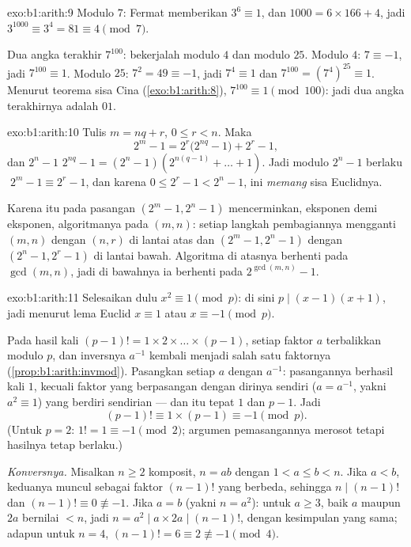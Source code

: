 \begin{solution}{exo:b1:arith:9}
Modulo $7$: Fermat memberikan $3^6 \equiv 1$, dan $1000 = 6 \times 166 + 4$,
jadi $3^{1000} \equiv 3^4 = 81 \equiv 4 \pmod 7$.

Dua angka terakhir $7^{100}$: bekerjalah modulo $4$ dan modulo $25$. Modulo $4$: $7
\equiv -1$, jadi $7^{100} \equiv 1$. Modulo $25$: $7^2 = 49 \equiv -1$, jadi
$7^4 \equiv 1$ dan $7^{100} = (7^4)^{25} \equiv 1$. Menurut teorema sisa
Cina (\cref{exo:b1:arith:8}), $7^{100} \equiv 1
\pmod{100}$: jadi dua angka terakhirnya adalah $01$.
\end{solution}

\begin{solution}{exo:b1:arith:10}
Tulis $m = nq + r$, $0 \leq r < n$. Maka
\[
2^m - 1 = 2^r\bigl(2^{nq} - 1\bigr) + 2^r - 1,
\]
dan $2^n - 1$  $2^{nq} - 1 = (2^n - 1)(2^{n(q-1)} + \dots +
1)$. Jadi modulo $2^n - 1$ berlaku $\;2^m - 1 \equiv 2^r - 1$, dan karena $0 \leq
2^r - 1 < 2^n - 1$, ini \emph{memang} sisa Euclidnya.

Karena itu  pada pasangan $(2^m - 1, 2^n - 1)$
mencerminkan, eksponen demi eksponen, algoritmanya pada $(m, n)$: setiap
langkah pembagiannya mengganti $(m, n)$ dengan $(n, r)$ di lantai atas dan $(2^m - 1,
2^n - 1)$ dengan $(2^n - 1, 2^r - 1)$ di lantai bawah. Algoritma di atasnya
berhenti pada $\gcd(m,n)$, jadi di bawahnya ia berhenti pada
$2^{\gcd(m,n)} - 1$.
\end{solution}

\begin{solution}{exo:b1:arith:11}
Selesaikan dulu $x^2 \equiv 1 \pmod p$: di sini $p \mid (x-1)(x+1)$, jadi menurut
lema Euclid $x \equiv 1$ atau $x \equiv -1 \pmod p$.

Pada hasil kali $(p-1)! = 1 \times 2 \times \dots \times (p-1)$, setiap
faktor $a$ terbalikkan modulo $p$, dan inversnya $a^{-1}$ kembali menjadi
salah satu faktornya (\cref{prop:b1:arith:invmod}). Pasangkan setiap $a$ dengan
$a^{-1}$: pasangannya berhasil kali $1$, kecuali faktor yang berpasangan dengan dirinya
sendiri ($a = a^{-1}$, yakni $a^2 \equiv 1$) yang berdiri sendirian --- dan itu
tepat $1$ dan $p - 1$. Jadi
\[
(p-1)! \equiv 1 \times (p - 1) \equiv -1 \pmod p .
\]
(Untuk $p = 2$: $1! = 1 \equiv -1 \pmod 2$; argumen pemasangannya
merosot tetapi hasilnya tetap berlaku.)

\emph{Konversnya.} Misalkan $n \geq 2$ komposit, $n = ab$ dengan $1 < a
\leq b < n$. Jika $a < b$, keduanya muncul sebagai faktor $(n-1)!$ yang berbeda,
sehingga $n \mid (n-1)!$ dan $(n-1)! \equiv 0 \not\equiv -1$. Jika $a = b$
(yakni $n = a^2$): untuk $a \geq 3$, baik $a$ maupun $2a$ bernilai $< n$, jadi
$n = a^2 \mid a \times 2a \mid (n-1)!$, dengan kesimpulan yang sama; adapun untuk $n = 4$,
$(n-1)! = 6 \equiv 2 \not\equiv -1 \pmod 4$.
\end{solution}

